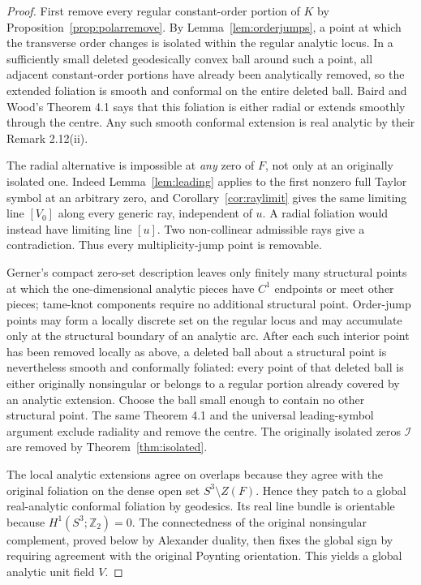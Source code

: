 \documentclass[aps,prd,reprint,nofootinbib,superscriptaddress]{revtex4-2}
\theoremstyle{definition}
\theoremstyle{remark}
\newcommand{\cI}{\mathcal{I}}
\begin{document}
\begin{proof}
First remove every regular constant-order portion of $K$ by Proposition~\ref{prop:polarremove}. By Lemma~\ref{lem:orderjumps}, a point at which the transverse order changes is isolated within the regular analytic locus. In a sufficiently small deleted geodesically convex ball around such a point, all adjacent constant-order portions have already been analytically removed, so the extended foliation is smooth and conformal on the entire deleted ball. Baird and Wood's Theorem 4.1 \cite{BairdWood1991} says that this foliation is either radial or extends smoothly through the centre.  Any such smooth conformal extension is real analytic by their Remark 2.12(ii).

The radial alternative is impossible at \emph{any} zero of $F$, not only at an originally isolated one. Indeed Lemma~\ref{lem:leading} applies to the first nonzero full Taylor symbol at an arbitrary zero, and Corollary~\ref{cor:raylimit} gives the same limiting line $[V_0]$ along every generic ray, independent of $u$. A radial foliation would instead have limiting line $[u]$. Two non-collinear admissible rays give a contradiction. Thus every multiplicity-jump point is removable.

Gerner's compact zero-set description leaves only finitely many structural points at which the one-dimensional analytic pieces have $C^1$ endpoints or meet other pieces; tame-knot components require no additional structural point.  Order-jump points may form a locally discrete set on the regular locus and may accumulate only at the structural boundary of an analytic arc.  After each such interior point has been removed locally as above, a deleted ball about a structural point is nevertheless smooth and conformally foliated: every point of that deleted ball is either originally nonsingular or belongs to a regular portion already covered by an analytic extension.  Choose the ball small enough to contain no other structural point.  The same Theorem 4.1 and the universal leading-symbol argument exclude radiality and remove the centre.  The originally isolated zeros $\cI$ are removed by Theorem~\ref{thm:isolated}.

The local analytic extensions agree on overlaps because they agree with the original foliation on the dense open set $S^3\setminus Z(F)$. Hence they patch to a global real-analytic conformal foliation by geodesics. Its real line bundle is orientable because $H^1(S^3;\mathbb Z_2)=0$.  The connectedness of the original nonsingular complement, proved below by Alexander duality, then fixes the global sign by requiring agreement with the original Poynting orientation. This yields a global analytic unit field $V$.
\end{proof}
\end{document}
